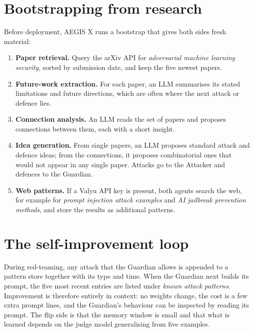 \documentclass[10pt,twocolumn]{article}
\begin{document}
\section{Bootstrapping from research}\label{sec:bootstrap}
Before deployment, AEGIS X runs a bootstrap that gives both sides fresh material:
\begin{enumerate}
  \item \textbf{Paper retrieval.} Query the arXiv API for \emph{adversarial machine learning security}, sorted by submission date, and keep the five newest papers.
  \item \textbf{Future-work extraction.} For each paper, an LLM summarises its stated limitations and future directions, which are often where the next attack or defence lies.
  \item \textbf{Connection analysis.} An LLM reads the set of papers and proposes connections between them, each with a short insight.
  \item \textbf{Idea generation.} From single papers, an LLM proposes standard attack and defence ideas; from the connections, it proposes combinatorial ones that would not appear in any single paper. Attacks go to the Attacker and defences to the Guardian.
  \item \textbf{Web patterns.} If a Valyu API key is present, both agents search the web, for example for \emph{prompt injection attack examples} and \emph{AI jailbreak prevention methods}, and store the results as additional patterns.
\end{enumerate}

\section{The self-improvement loop}\label{sec:loop}
During red-teaming, any attack that the Guardian allows is appended to a pattern store together with its type and time. When the Guardian next builds its prompt, the five most recent entries are listed under \emph{known attack patterns}. Improvement is therefore entirely in context: no weights change, the cost is a few extra prompt lines, and the Guardian's behaviour can be inspected by reading its prompt. The flip side is that the memory window is small and that what is learned depends on the judge model generalising from five examples.
\end{document}
